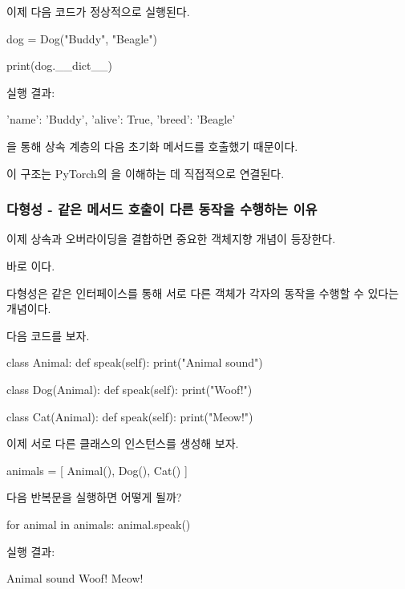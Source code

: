 이제 다음 코드가 정상적으로 실행된다.

\begin{dhkcode}
dog = Dog("Buddy", "Beagle")

print(dog.__dict__)
\end{dhkcode}

실행 결과:

\begin{dhkzsh}
{
    'name': 'Buddy',
    'alive': True,
    'breed': 'Beagle'
}
\end{dhkzsh}

을 통해 상속 계층의 다음 초기화 메서드를 호출했기 때문이다.

이 구조는 PyTorch의 을 이해하는 데 직접적으로 연결된다.

\subsubsection{다형성 - 같은 메서드 호출이 다른 동작을 수행하는 이유}

이제 상속과 오버라이딩을 결합하면 중요한 객체지향 개념이 등장한다.

바로 이다.

다형성은 같은 인터페이스를 통해 서로 다른 객체가 각자의 동작을 수행할 수 있다는 개념이다.

다음 코드를 보자.

\begin{dhkcode}
class Animal:
    def speak(self):
        print("Animal sound")


class Dog(Animal):
    def speak(self):
        print("Woof!")


class Cat(Animal):
    def speak(self):
        print("Meow!")
\end{dhkcode}

이제 서로 다른 클래스의 인스턴스를 생성해 보자.

\begin{dhkcode}
animals = [
    Animal(),
    Dog(),
    Cat()
]
\end{dhkcode}

다음 반복문을 실행하면 어떻게 될까?

\begin{dhkcode}
for animal in animals:
    animal.speak()
\end{dhkcode}

실행 결과:

\begin{dhkzsh}
Animal sound
Woof!
Meow!
\end{dhkzsh}

